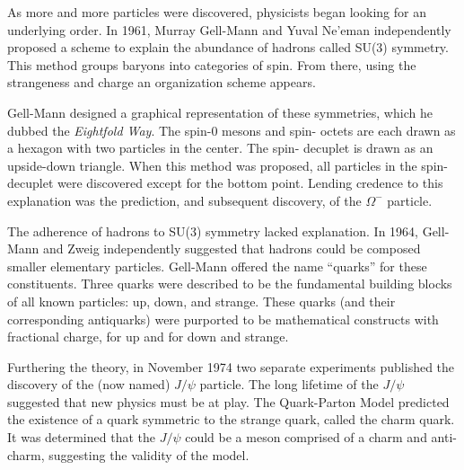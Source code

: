 
As more and more particles were discovered, physicists began looking for an underlying order. In 1961, Murray Gell-Mann and Yuval Ne'eman independently proposed a scheme to explain the abundance of hadrons called SU(3) symmetry. This method groups baryons into categories of spin. From there, using the strangeness and charge an organization scheme appears. 

Gell-Mann designed a graphical representation of these symmetries, which he dubbed the \textit{Eightfold Way}. The spin-0 mesons and spin- octets are each drawn as a hexagon with two particles in the center. The spin- decuplet is drawn as an upside-down triangle. When this method was proposed, all particles in the spin- decuplet were discovered except for the bottom point. Lending credence to this explanation was the prediction, and subsequent discovery, of the $\Omega^-$ particle.
\cite{DoQ}\cite{GRIF}


The adherence of hadrons to SU(3) symmetry lacked explanation. In 1964, Gell-Mann and Zweig independently suggested that hadrons could be composed smaller elementary particles. Gell-Mann offered the name ``quarks'' for these constituents. Three quarks were described to be the fundamental building blocks of all known particles: up, down, and strange. These quarks (and their corresponding antiquarks) were purported to be mathematical constructs with fractional charge,  for up and  for down and strange.

Furthering the theory, in November 1974 two separate experiments published the discovery of the (now named) $J/\psi$ particle. The long lifetime of the $J/\psi$ suggested that new physics must be at play. The Quark-Parton Model predicted the existence of a quark symmetric to the strange quark, called the charm quark. It was determined that the $J/\psi$ could be a meson comprised of a charm and anti-charm, suggesting the validity of the model.